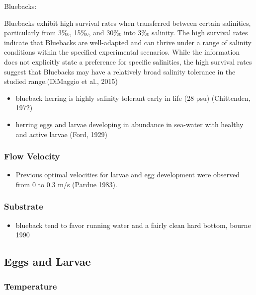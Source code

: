 \documentclass[
]{book}
\providecommand{\tightlist}{%
  \setlength{\itemsep}{0pt}\setlength{\parskip}{0pt}}
\begin{document}
Bluebacks:

Bluebacks exhibit high survival rates when transferred between certain salinities, particularly from 3‰, 15‰, and 30‰ into 3‰ salinity.
The high survival rates indicate that Bluebacks are well-adapted and can thrive under a range of salinity conditions within the specified experimental scenarios.
While the information does not explicitly state a preference for specific salinities, the high survival rates suggest that Bluebacks may have a relatively broad salinity tolerance in the studied range.(DiMaggio et al., 2015)

\begin{itemize}
\tightlist
\item
  blueback herring is highly salinity tolerant early in life (28 psu) (Chittenden, 1972)
\item
  herring eggs and larvae developing in abundance in sea-water with healthy and active larvae (Ford, 1929)
\end{itemize}

\hypertarget{flow-velocity-7}{%
\subsubsection{Flow Velocity}\label{flow-velocity-7}}

\begin{itemize}
\tightlist
\item
  Previous optimal velocities for larvae and egg development were observed from 0 to 0.3 m/s (Pardue 1983).
\end{itemize}

\hypertarget{substrate-7}{%
\subsubsection{Substrate}\label{substrate-7}}

\begin{itemize}
\tightlist
\item
  blueback tend to favor running water and a fairly clean hard bottom, bourne 1990
\end{itemize}

\hypertarget{eggs-and-larvae}{%
\subsection{Eggs and Larvae}\label{eggs-and-larvae}}

\hypertarget{temperature-8}{%
\subsubsection{Temperature}\label{temperature-8}}
\end{document}
